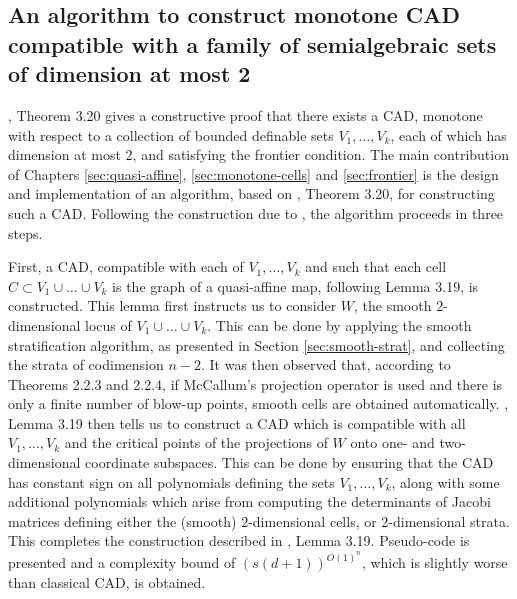 \documentclass[
]{book}
\theoremstyle{definition}
\theoremstyle{definition}
\theoremstyle{definition}
\theoremstyle{definition}
\theoremstyle{remark}
\begin{document}
\hypertarget{an-algorithm-to-construct-monotone-cad-compatible-with-a-family-of-semialgebraic-sets-of-dimension-at-most-2}{%
\subsection{An algorithm to construct monotone CAD compatible with a family of semialgebraic sets of dimension at most 2}\label{an-algorithm-to-construct-monotone-cad-compatible-with-a-family-of-semialgebraic-sets-of-dimension-at-most-2}}

\citet{bgv15}, Theorem 3.20 gives a constructive proof that there exists a CAD, monotone with respect to a collection of bounded definable sets \(V_1,\ldots,V_k\), each of which has dimension at most \(2\), and satisfying the frontier condition. The main contribution of Chapters \ref{sec:quasi-affine}, \ref{sec:monotone-cells} and \ref{sec:frontier} is the design and implementation of an algorithm, based on \citet{bgv15}, Theorem 3.20, for constructing such a CAD. Following the construction due to \citet{bgv15}, the algorithm proceeds in three steps.

First, a CAD, compatible with each of \(V_1,\ldots,V_k\) and such that each cell \(C \subset V_1 \cup \ldots \cup V_k\) is the graph of a quasi-affine map, following \citet{bgv15} Lemma 3.19, is constructed. This lemma first instructs us to consider \(W\), the smooth \(2\)-dimensional locus of \(V_1 \cup \ldots \cup V_k\).
This can be done by applying the smooth stratification algorithm, as presented in Section \ref{sec:smooth-strat}, and collecting the strata of codimension \(n-2\).
It was then observed that, according to \citet{mccallum1998} Theorems 2.2.3 and 2.2.4, if McCallum's projection operator is used and there is only a finite number of blow-up points, smooth cells are obtained automatically.
\citet{bgv15}, Lemma 3.19 then tells us to construct a CAD which is compatible with all \(V_1,\ldots,V_k\) and the critical points of the projections of \(W\) onto one- and two-dimensional coordinate subspaces. This can be done by ensuring that the CAD has constant sign on all polynomials defining the sets \(V_1,\ldots,V_k\), along with some additional polynomials which arise from computing the determinants of Jacobi matrices defining either the (smooth) \(2\)-dimensional cells, or \(2\)-dimensional strata.
This completes the construction described in \citet{bgv15}, Lemma 3.19. Pseudo-code is presented and a complexity bound of \(\left(s (d+1)\right)^{O(1)^{n}}\), which is slightly worse than classical CAD, is obtained.
\end{document}
